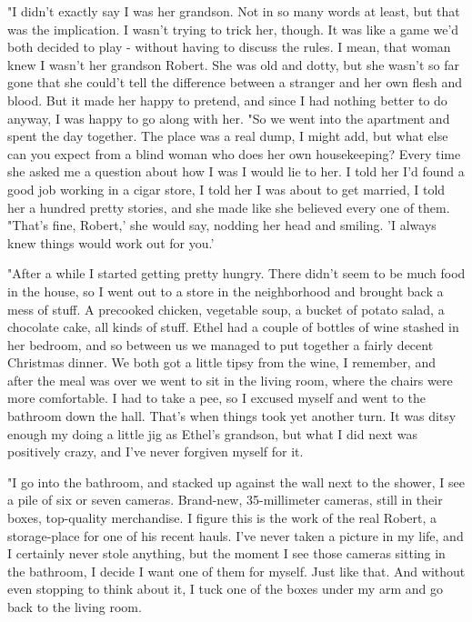 \documentclass[10pt,a4paper]{article}
\begin{document}
"I didn't exactly say I was her grandson. Not in so many words at least, but that was the implication. I wasn't trying to trick her, though. It was like a game we'd both decided to play - without having to discuss the rules. I mean, that woman knew I wasn't her grandson Robert. She was old and dotty, but she wasn't so far gone that she could't tell the difference between a stranger and her own flesh and blood. But it made her happy to pretend, and since I had nothing better to do anyway, I was happy to go along with her.
"So we went into the apartment and spent the day together. The place was a real dump, I might add, but what else can you expect from a blind woman who does her own housekeeping? Every time she asked me a question about how I was I would lie to her. I told her I'd found a good job working in a cigar store, I told her I was about to get married, I told her a hundred pretty stories, and she made like she believed every one of them. "That's fine, Robert,' she would say, nodding her head and smiling. 'I always knew things would work out for you.'

"After a while I started getting pretty hungry. There didn't seem to be much food in the house, so I went out to a store in the neighborhood and brought back a mess of stuff. A precooked chicken, vegetable soup, a bucket of potato salad, a chocolate cake, all kinds of stuff. Ethel had a couple of bottles of wine stashed in her bedroom, and so between us we managed to put together a fairly decent Christmas dinner. We both got a little tipsy from the wine, I remember, and after the meal was over we went to sit in the living room, where the chairs were more comfortable. I had to take a pee, so I excused myself and went to the bathroom down the hall. That's when things took yet another turn. It was ditsy enough my doing a little jig as Ethel's grandson, but what I did next was positively crazy, and I've never forgiven myself for it.

"I go into the bathroom, and stacked up against the wall next to the shower, I see a pile of six or seven cameras. Brand-new, 35-millimeter cameras, still in their boxes, top-quality merchandise. I figure this is the work of the real Robert, a storage-place for one of his recent hauls. I've never taken a picture in my life, and I certainly never stole anything, but the moment I see those cameras sitting in the bathroom, I decide I want one of them for myself. Just like that. And without even stopping to think about it, I tuck one of the boxes under my arm and go back to the living room.
\end{document}
